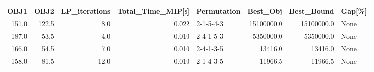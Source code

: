 \begin{tabular}{rrrrlrrl}
\toprule
  OBJ1 &   OBJ2 &  LP\_iterations &  Total\_Time\_MIP[s] & Permutation &    Best\_Obj &  Best\_Bound & Gap[\%] \\
\midrule
 151.0 &  122.5 &            8.0 &              0.022 &   2-1-5-4-3 &  15100000.0 &  15100000.0 &   None \\
 187.0 &   53.5 &            4.0 &              0.010 &   2-4-1-5-3 &   5350000.0 &   5350000.0 &   None \\
 166.0 &   54.5 &            7.0 &              0.010 &   2-4-1-3-5 &     13416.0 &     13416.0 &   None \\
 158.0 &   81.5 &           12.0 &              0.010 &   2-1-4-3-5 &     11966.5 &     11966.5 &   None \\
\bottomrule
\end{tabular}

